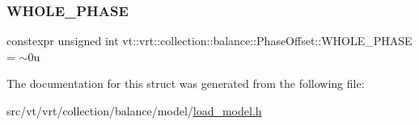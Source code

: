 \subsubsection{\texorpdfstring{W\+H\+O\+L\+E\+\_\+\+P\+H\+A\+SE}{WHOLE\_PHASE}}
{\footnotesize\ttfamily constexpr unsigned int vt\+::vrt\+::collection\+::balance\+::\+Phase\+Offset\+::\+W\+H\+O\+L\+E\+\_\+\+P\+H\+A\+SE = $\sim$0u\hspace{0.3cm}{\ttfamily [static]}}



The documentation for this struct was generated from the following file\+:\begin{DoxyCompactItemize}
\item 
src/vt/vrt/collection/balance/model/\hyperlink{load__model_8h}{load\+\_\+model.\+h}\end{DoxyCompactItemize}
